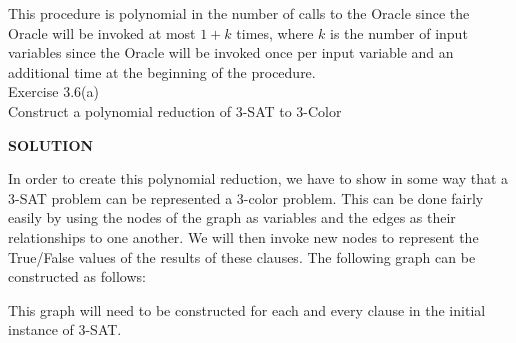 \documentclass{exam} %
\theoremstyle{plain}
\theoremstyle{definition}
\theoremstyle{remark}
\numberwithin{equation}{section}  %
\newcommand{\sol}{\begin{center}\textbf{SOLUTION}\end{center}}
\begin{document}
\begin{questions}
  This procedure is polynomial in the number of calls to the Oracle since the 
  Oracle will be invoked at most $1+k$ times, where $k$ is the number of
  input variables since the Oracle will be invoked once per input variable
  and an additional time at the beginning of the procedure.\\
  \question Exercise 3.6(a)\\
  Construct a polynomial reduction of 3-SAT to 3-Color\\
  \sol
  In order to create this polynomial reduction, we have to show in some way that
  a 3-SAT problem can be represented a 3-color problem. This can be done fairly 
  easily by using the nodes of the graph as variables and the edges as their 
  relationships to one another. We will then invoke new nodes to represent the
  True/False values of the results of these clauses. The following graph can be
  constructed as follows:
  \begin{center}
  \end{center}
  This graph will need to be constructed for each and every clause in the initial
  instance of 3-SAT.\\


\end{questions}
\end{document}

